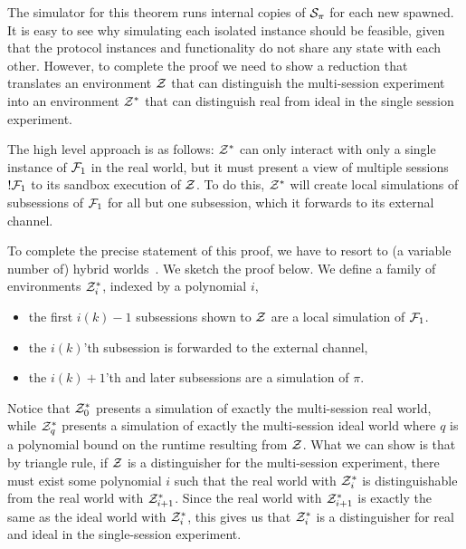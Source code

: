 The simulator for this theorem runs internal copies of $\mathcal{S}_\pi$ for each new  spawned.
It is easy to see why simulating each isolated instance should be feasible, given that the protocol instances and functionality do not share any state with each other.
However, to complete the proof we need to show a reduction that translates an environment $\mathcal{Z}$ that can distinguish the multi-session experiment into an environment $\mathcal{Z}^*$ that can distinguish real from ideal in the single session experiment.

The high level approach is as follows: $\mathcal{Z}^*$ can only interact with only a single instance of $\mathcal{F}_1$ in the real world, but it must present a view of multiple sessions $!\mathcal{F}_1$ to its sandbox execution of $\mathcal{Z}$.
To do this, $\mathcal{Z}^*$ will create local simulations of subsessions of $\mathcal{F}_1$ for all but one subsession, which it forwards to its external channel.

To complete the precise statement of this proof, we have to resort to (a variable number of) hybrid worlds~\cite{canettiUC,variablehybrids}. We sketch the proof below.
We define a family of environments $\mathcal{Z}^*_i$, indexed by a polynomial $i$,
\begin{itemize}
\item the first $i(k)-1$ subsessions shown to $\mathcal{Z}$ are a local simulation of $\mathcal{F}_1$.
\item the $i(k)$'th subsession is forwarded to the external channel,
\item the $i(k)+1$'th and later subsessions are a simulation of $\pi$.
\end{itemize}
Notice that $\mathcal{Z}^*_0$ presents a simulation of exactly the multi-session real world, while $\mathcal{Z}^*_q$ presents a simulation of exactly the multi-session ideal world where $q$ is a polynomial bound on the runtime resulting from $\mathcal{Z}$.
What we can show is that by triangle rule, if $\mathcal{Z}$ is a distinguisher for the multi-session experiment, there must exist some polynomial $i$ such that the real world with $\mathcal{Z}^*_i$ is distinguishable from the real world with $\mathcal{Z}^*_{i+1}$. Since the real world with $\mathcal{Z}^*_{i+1}$ is exactly the same as the ideal world with $\mathcal{Z}^*_i$, this gives us that $\mathcal{Z}^*_i$ is a distinguisher for real and ideal in the single-session experiment.

